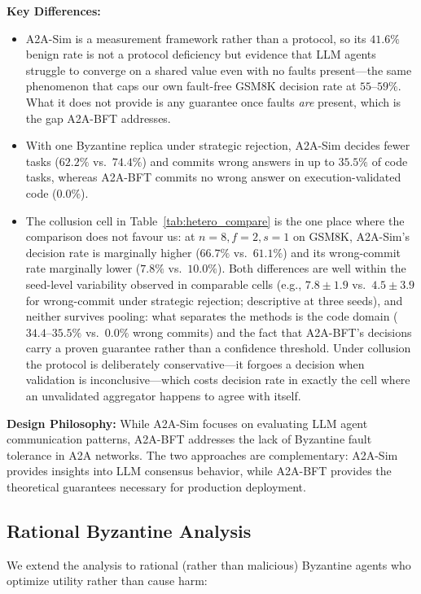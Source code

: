 \documentclass{article}
\begin{document}
\textbf{Key Differences:}
\begin{itemize}
    \item A2A-Sim is a measurement framework rather than a protocol, so its $41.6\%$ benign rate is not a protocol deficiency but evidence that LLM agents struggle to converge on a shared value even with no faults present---the same phenomenon that caps our own fault-free GSM8K decision rate at $55$--$59\%$. What it does not provide is any guarantee once faults \emph{are} present, which is the gap A2A-BFT addresses.
    \item With one Byzantine replica under strategic rejection, A2A-Sim decides fewer tasks ($62.2\%$ vs.\ $74.4\%$) and commits wrong answers in up to $35.5\%$ of code tasks, whereas A2A-BFT commits no wrong answer on execution-validated code ($0.0\%$).
    \item The collusion cell in Table~\ref{tab:hetero_compare} is the one place where the comparison does not favour us: at $n{=}8, f{=}2, s{=}1$ on GSM8K, A2A-Sim's decision rate is marginally higher ($66.7\%$ vs.\ $61.1\%$) and its wrong-commit rate marginally lower ($7.8\%$ vs.\ $10.0\%$). Both differences are well within the seed-level variability observed in comparable cells (e.g., $7.8{\pm}1.9$ vs.\ $4.5{\pm}3.9$ for wrong-commit under strategic rejection; descriptive at three seeds), and neither survives pooling: what separates the methods is the code domain ($34.4$--$35.5\%$ vs.\ $0.0\%$ wrong commits) and the fact that A2A-BFT's decisions carry a proven guarantee rather than a confidence threshold. Under collusion the protocol is deliberately conservative---it forgoes a decision when validation is inconclusive---which costs decision rate in exactly the cell where an unvalidated aggregator happens to agree with itself.
\end{itemize}

\textbf{Design Philosophy:} While A2A-Sim focuses on evaluating LLM agent communication patterns, A2A-BFT addresses the lack of Byzantine fault tolerance in A2A networks. The two approaches are complementary: A2A-Sim provides insights into LLM consensus behavior, while A2A-BFT provides the theoretical guarantees necessary for production deployment.

\subsection{Rational Byzantine Analysis}\label{app:rational}

We extend the analysis to rational (rather than malicious) Byzantine agents who optimize utility rather than cause harm:
\end{document}
